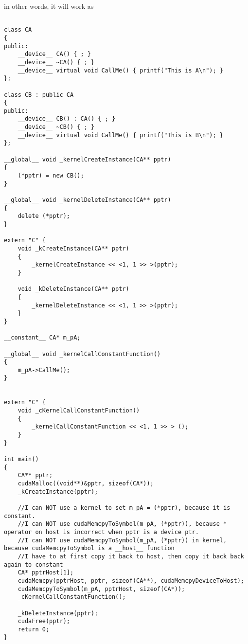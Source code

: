 in other words, it will work as
\begin{lstlisting}

class CA
{
public:
    __device__ CA() { ; }
    __device__ ~CA() { ; }
    __device__ virtual void CallMe() { printf("This is A\n"); }
};

class CB : public CA
{
public:
    __device__ CB() : CA() { ; }
    __device__ ~CB() { ; }
    __device__ virtual void CallMe() { printf("This is B\n"); }
};

__global__ void _kernelCreateInstance(CA** pptr)
{
    (*pptr) = new CB();
}

__global__ void _kernelDeleteInstance(CA** pptr)
{
    delete (*pptr);
}

extern "C" {
    void _kCreateInstance(CA** pptr)
    {
        _kernelCreateInstance << <1, 1 >> >(pptr);
    }

    void _kDeleteInstance(CA** pptr)
    {
        _kernelDeleteInstance << <1, 1 >> >(pptr);
    }
}

__constant__ CA* m_pA;

__global__ void _kernelCallConstantFunction()
{
    m_pA->CallMe();
}


extern "C" {
    void _cKernelCallConstantFunction()
    {
        _kernelCallConstantFunction << <1, 1 >> > ();
    }
}

int main()
{
    CA** pptr;
    cudaMalloc((void**)&pptr, sizeof(CA*));
    _kCreateInstance(pptr);

    //I can NOT use a kernel to set m_pA = (*pptr), because it is constant.
    //I can NOT use cudaMemcpyToSymbol(m_pA, (*pptr)), because * operator on host is incorrect when pptr is a device ptr.
    //I can NOT use cudaMemcpyToSymbol(m_pA, (*pptr)) in kernel, because cudaMemcpyToSymbol is a __host__ function
    //I have to at first copy it back to host, then copy it back back again to constant
    CA* pptrHost[1];
    cudaMemcpy(pptrHost, pptr, sizeof(CA**), cudaMemcpyDeviceToHost);
    cudaMemcpyToSymbol(m_pA, pptrHost, sizeof(CA*));
    _cKernelCallConstantFunction();

    _kDeleteInstance(pptr);
    cudaFree(pptr);
    return 0;
}

\end{lstlisting} 